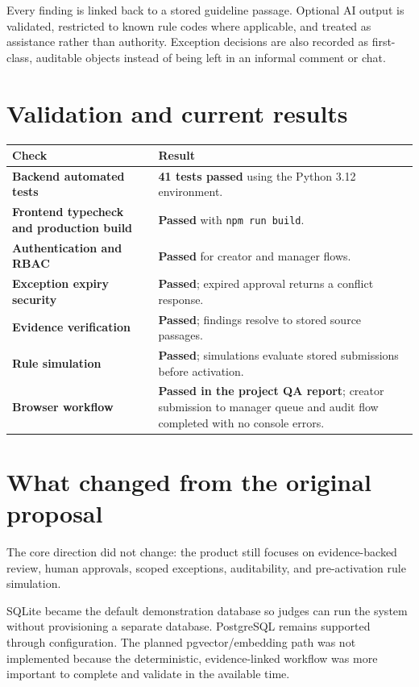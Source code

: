 \documentclass[11pt,a4paper]{article}
\newcommand{\status}[1]{\textcolor{precedentgreen}{\textbf{#1}}}
\begin{document}
Every finding is linked back to a stored guideline passage. Optional AI output is validated,
restricted to known rule codes where applicable, and treated as assistance rather than
authority. Exception decisions are also recorded as first-class, auditable objects instead
of being left in an informal comment or chat.

\section{Validation and current results}

\begin{table}[h]
\centering
\begin{tabularx}{\textwidth}{>{\bfseries}p{}X}
\toprule
\textbf{Check} & \textbf{Result}\\
\midrule
Backend automated tests & \status{41 tests passed} using the Python 3.12 environment.\\
Frontend typecheck and production build & \status{Passed} with \texttt{npm run build}.\\
Authentication and RBAC & \status{Passed} for creator and manager flows.\\
Exception expiry security & \status{Passed}; expired approval returns a conflict response.\\
Evidence verification & \status{Passed}; findings resolve to stored source passages.\\
Rule simulation & \status{Passed}; simulations evaluate stored submissions before activation.\\
Browser workflow & \status{Passed in the project QA report}; creator submission to manager queue and audit flow completed with no console errors.\\
\bottomrule
\end{tabularx}
\end{table}

\section{What changed from the original proposal}

The core direction did not change: the product still focuses on evidence-backed review,
human approvals, scoped exceptions, auditability, and pre-activation rule simulation.

SQLite became the default demonstration database so judges can run the system without
provisioning a separate database. PostgreSQL remains supported through configuration.
The planned pgvector/embedding path was not implemented because the deterministic,
evidence-linked workflow was more important to complete and validate in the available time.
\end{document}
